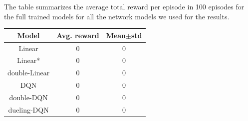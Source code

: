 \documentclass{article}
\begin{document}
The table summarizes the average total reward per episode in 100 episodes for the full trained models for all the network models we used for the results.
\begin{center}
 \begin{tabular}{||c | c c||} 
 \hline
 Model & Avg. reward & Mean$\pm$std \\ [0.5ex] 
 \hline\hline
 Linear & 0 & 0 \\ 
 \hline
 Linear* & 0 & 0 \\
 \hline
 double-Linear & 0 & 0 \\
 \hline
 DQN & 0 & 0 \\
 \hline
 double-DQN & 0 & 0 \\  
 \hline
 dueling-DQN & 0 & 0 \\ 
 \hline
\end{tabular}
\end{center}
\end{document}
